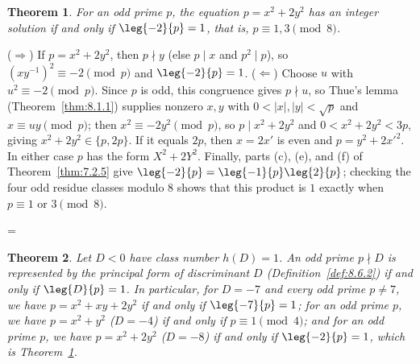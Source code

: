 \documentclass[11pt]{article}
\makeatletter
\theoremstyle{ntstyle}
\newtheorem{theorem}{Theorem}[subsection]
\let\nt@closedisplay\]
\def\nt@guardedclose{\@ifnextchar\par{\nt@closeafterpar}{\@ifnextchar\end{\postdisplaypenalty\@M\nt@closedisplay}{\nt@closedisplay}}}
\def\nt@closeafterpar\par{\@ifnextchar\par{\nt@closeafterpar}{\@ifnextchar\end{\postdisplaypenalty\@M\nt@closedisplay\par}{\nt@closedisplay\par}}}
\renewenvironment{proof}[1][\proofname]{\par
  \pushQED{\qed}\normalfont\topsep\medskipamount\edef\nt@afterproof{\@endparpenalty=\the\@endparpenalty\relax}\@beginparpenalty\@M\@endparpenalty\@M\let\]\nt@guardedclose\trivlist\item[]\textit{#1\@addpunct{.}} \ignorespaces}{\ifvmode\addpenalty\@M\fi\popQED\nt@afterproof\endtrivlist\@endpefalse}
\makeatother
\begin{document}
\begin{theorem}\label{thm:8.6.4} For an
	odd prime $p$, the equation $p = x^2 + 2y^2$ has an integer solution
	if and only if $\leg{-2}{p} = 1$, that is, $p \equiv 1, 3 \pmod{8}$.

\end{theorem}

\begin{proof} ($\Rightarrow$) If $p = x^2 + 2y^2$, then $p
		\nmid y$ (else $p \mid x$ and $p^2 \mid p$), so $(xy^{-1})^2 \equiv
		-2 \pmod{p}$ and $\leg{-2}{p} = 1$. ($\Leftarrow$)
	Choose $u$ with $u^2 \equiv -2 \pmod{p}$. Since $p$ is odd, this
	congruence gives $p\nmid u$, so Thue's lemma
	(Theorem~\ref{thm:8.1.1}) supplies nonzero $x,y$ with
	$0<|x|, |y| < \sqrt{p}$ and
	$x \equiv u y \pmod{p}$; then $x^2 \equiv -2y^2 \pmod{p}$, so $p \mid
		x^2 + 2y^2$ and $0 < x^2 + 2y^2 < 3p$, giving $x^2 + 2y^2 \in \{p,
		2p\}$. If it equals $2p$, then $x = 2x'$ is even and $p = y^2 +
		2x'^2$. In either case $p$ has the form $X^2 + 2Y^2$. Finally,
	parts (c), (e), and (f) of Theorem~\ref{thm:7.2.5} give
	$\leg{-2}{p}=\leg{-1}{p}\leg{2}{p}$; checking the four odd residue
	classes modulo $8$ shows that this product is $1$ exactly when
	$p\equiv1$ or $3\pmod{8}$.

\end{proof}
\begin{theorem}\label{thm:8.6.5} Let $D < 0$ have class
	number $h(D) = 1$. An odd
	prime $p \nmid D$ is represented by the principal form of
	discriminant $D$ (Definition~\ref{def:8.6.2}) if and only if $\leg{D}{p} = 1$. In
	particular, for $D=-7$ and every odd prime $p\neq7$, we have
	$p=x^2+xy+2y^2$ if and only if $\leg{-7}{p}=1$;
	for an odd prime $p$, we have $p = x^2 + y^2$ ($D = -4$) if and only if $p \equiv 1
		\pmod{4}$; and for an odd prime $p$, we have $p = x^2 + 2y^2$ ($D = -8$) if and
	only if $\leg{-2}{p} = 1$, which is Theorem~\ref{thm:8.6.4}.

\end{theorem}
\end{document}
